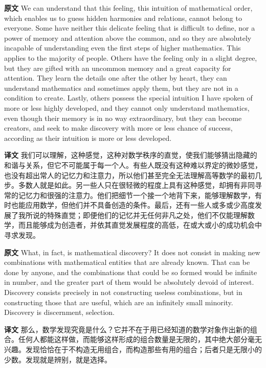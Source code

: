 \documentclass[UTF8,zihao=-4]{ctexart}
\newcommand{\BodyFont}{\fontsize{10.5pt}{15.5pt}\selectfont}
\newcommand{\origlabel}{\textbf{原文}\quad}
\newcommand{\translabel}{\textbf{译文}\quad}
\newenvironment{enblock}{\par\noindent\begingroup\BodyFont\origlabel}{\par\endgroup}
\newenvironment{zhblock}{\par\noindent\begingroup\BodyFont\translabel}{\par\endgroup\vspace{0.35em}}
\begin{document}
\begin{enblock}
We can understand that this feeling, this intuition of mathematical order, which enables us to guess hidden harmonies and relations, cannot belong to everyone. Some have neither this delicate feeling that is difficult to define, nor a power of memory and attention above the common, and so they are absolutely incapable of understanding even the first steps of higher mathematics. This applies to the majority of people. Others have the feeling only in a slight degree, but they are gifted with an uncommon memory and a great capacity for attention. They learn the details one after the other by heart, they can understand mathematics and sometimes apply them, but they are not in a condition to create. Lastly, others possess the special intuition I have spoken of more or less highly developed, and they cannot only understand mathematics, even though their memory is in no way extraordinary, but they can become creators, and seek to make discovery with more or less chance of success, according as their intuition is more or less developed.
\end{enblock}
\begin{zhblock}
我们可以理解，这种感觉，这种对数学秩序的直觉，使我们能够猜出隐藏的和谐与关系，但它不可能属于每一个人。有些人既没有这种难以界定的微妙感觉，也没有超出常人的记忆力和注意力，所以他们甚至完全无法理解高等数学的最初几步。多数人就是如此。另一些人只在很轻微的程度上具有这种感觉，却拥有非同寻常的记忆力和很强的注意力。他们把细节一个接一个地背下来，能够理解数学，有时也能应用数学，但他们并不具备创造的条件。最后，还有一些人或多或少高度发展了我所说的特殊直觉；即便他们的记忆并无任何非凡之处，他们不仅能理解数学，而且能够成为创造者，并依其直觉发展程度的高低，在或大或小的成功机会中寻求发现。\end{zhblock}

\begin{enblock}
What, in fact, is mathematical discovery? It does not consist in making new combinations with mathematical entities that are already known. That can be done by anyone, and the combinations that could be so formed would be infinite in number, and the greater part of them would be absolutely devoid of interest. Discovery consists precisely in not constructing useless combinations, but in constructing those that are useful, which are an infinitely small minority. Discovery is discernment, selection.
\end{enblock}
\begin{zhblock}
那么，数学发现究竟是什么？它并不在于用已经知道的数学对象作出新的组合。任何人都能这样做，而能够这样形成的组合数量是无限的，其中绝大部分毫无兴趣。发现恰恰在于不构造无用组合，而构造那些有用的组合；后者只是无限小的少数。发现就是辨别，就是选择。\end{zhblock}
\end{document}

